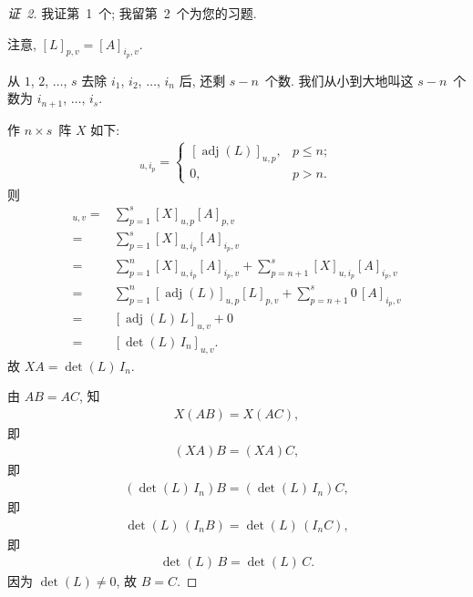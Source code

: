 \documentclass[../libro.tex]{subfiles}
\begin{document}
\begin{proof}[证~2]
    我证第~1~个; 我留第~2~个为您的习题.

    注意, \([L]_{p,v} = [A]_{i_p,v}\).

    从 \(1\), \(2\), \(\dots\), \(s\)
    去除 \(i_1\), \(i_2\), \(\dots\), \(i_n\)
    后, 还剩 \(s - n\)~个数.
    我们从小到大地叫这 \(s - n\)~个数为
    \(i_{n+1}\), \(\dots\), \(i_s\).

    作 \(n \times s\)~阵 \(X\) 如下:
    \begin{align*}
        [X]_{u,i_p} =
        \begin{cases}
            [\operatorname{adj} {(L)}]_{u,p},
            & p \leq n; \\
            0, & p > n.
        \end{cases}
    \end{align*}
    则
    \begin{align*}
        [XA]_{u,v}
        = {} &
        \sum_{p = 1}^{s} {[X]_{u,p} [A]_{p,v}}
        \\
        = {} &
        \sum_{p = 1}^{s} {[X]_{u,i_p} [A]_{i_p,v}}
        \\
        = {} &
        \sum_{p = 1}^{n} {[X]_{u,i_p} [A]_{i_p,v}}
        + \sum_{p = n+1}^{s} {[X]_{u,i_p} [A]_{i_p,v}}
        \\
        = {} &
        \sum_{p = 1}^{n}
        {[\operatorname{adj} {(L)}]_{u,p} [L]_{p,v}}
        + \sum_{p = n+1}^{s} {0\, [A]_{i_p,v}}
        \\
        = {} &
        [\operatorname{adj} {(L)}\, L]_{u,v} + 0
        \\
        = {} &
        [\det {(L)}\,I_n]_{u,v}.
    \end{align*}
    故 \(X A = \det {(L)}\, I_n\).

    由 \(AB = AC\), 知
    \begin{align*}
        X (AB) = X (AC),
    \end{align*}
    即
    \begin{align*}
        (X A) B = (X A) C,
    \end{align*}
    即
    \begin{align*}
        (\det {(L)}\,I_n) B = (\det {(L)}\,I_n) C,
    \end{align*}
    即
    \begin{align*}
        \det {(L)}\,(I_n B) = \det {(L)}\,(I_n C),
    \end{align*}
    即
    \begin{align*}
        \det {(L)}\,B = \det {(L)}\,C.
    \end{align*}
    因为 \(\det {(L)} \neq 0\),
    故 \(B = C\).
\end{proof}
\end{document}
